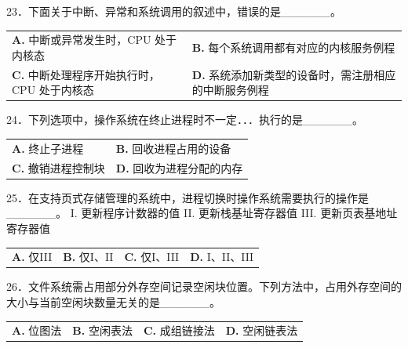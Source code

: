 \documentclass[UTF8,11pt]{ctexart}
\begin{document}
23．下面关于中断、异常和系统调用的叙述中，错误的是\_\_\_\_\_\_。


\begin{center}\begin{tabular}{>{\raggedright\arraybackslash}p{\dimexpr(\linewidth-4\tabcolsep)/2\relax}>{\raggedright\arraybackslash}p{\dimexpr(\linewidth-4\tabcolsep)/2\relax}}
\textbf{A.} 中断或异常发生时，CPU 处于内核态 & \textbf{B.} 每个系统调用都有对应的内核服务例程\\[.35em]
\textbf{C.} 中断处理程序开始执行时，CPU 处于内核态 & \textbf{D.} 系统添加新类型的设备时，需注册相应的中断服务例程\\[.35em]\end{tabular}\end{center}

24．下列选项中，操作系统在终止进程时不一定．．．执行的是\_\_\_\_\_\_。


\begin{center}\begin{tabular}{>{\raggedright\arraybackslash}p{\dimexpr(\linewidth-4\tabcolsep)/2\relax}>{\raggedright\arraybackslash}p{\dimexpr(\linewidth-4\tabcolsep)/2\relax}}
\textbf{A.} 终止子进程 & \textbf{B.} 回收进程占用的设备\\[.35em]
\textbf{C.} 撤销进程控制块 & \textbf{D.} 回收为进程分配的内存\\[.35em]\end{tabular}\end{center}

25．在支持页式存储管理的系统中，进程切换时操作系统需要执行的操作是\_\_\_\_\_\_。 I. 更新程序计数器的值 II. 更新栈基址寄存器值 III. 更新页表基地址寄存器值


\begin{center}\begin{tabular}{>{\raggedright\arraybackslash}p{\dimexpr(\linewidth-8\tabcolsep)/4\relax}>{\raggedright\arraybackslash}p{\dimexpr(\linewidth-8\tabcolsep)/4\relax}>{\raggedright\arraybackslash}p{\dimexpr(\linewidth-8\tabcolsep)/4\relax}>{\raggedright\arraybackslash}p{\dimexpr(\linewidth-8\tabcolsep)/4\relax}}
\textbf{A.} 仅III & \textbf{B.} 仅I、II & \textbf{C.} 仅I、III & \textbf{D.} I、II、III\\[.35em]\end{tabular}\end{center}

26．文件系统需占用部分外存空间记录空闲块位置。下列方法中，占用外存空间的大小与当前空闲块数量无关的是\_\_\_\_\_\_。


\begin{center}\begin{tabular}{>{\raggedright\arraybackslash}p{\dimexpr(\linewidth-8\tabcolsep)/4\relax}>{\raggedright\arraybackslash}p{\dimexpr(\linewidth-8\tabcolsep)/4\relax}>{\raggedright\arraybackslash}p{\dimexpr(\linewidth-8\tabcolsep)/4\relax}>{\raggedright\arraybackslash}p{\dimexpr(\linewidth-8\tabcolsep)/4\relax}}
\textbf{A.} 位图法 & \textbf{B.} 空闲表法 & \textbf{C.} 成组链接法 & \textbf{D.} 空闲链表法\\[.35em]\end{tabular}\end{center}
\end{document}
